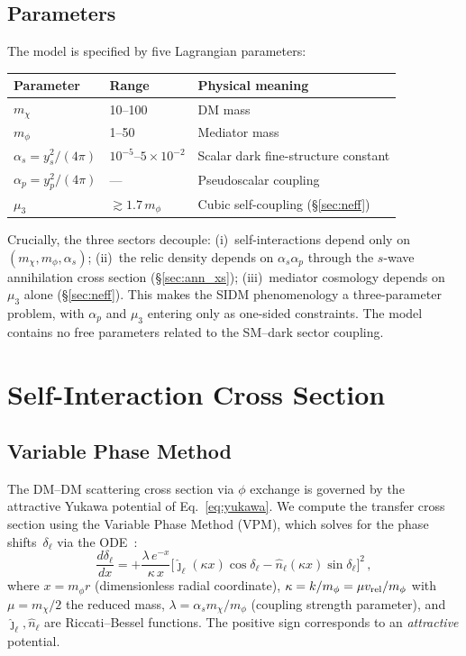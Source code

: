 \documentclass[aps,prd,twocolumn,superscriptaddress,nofootinbib]{revtex4-2}
\newcommand{\GeV}{\,\text{GeV}}
\newcommand{\MeV}{\,\text{MeV}}
\newcommand{\mchi}{m_\chi}
\newcommand{\mphi}{m_\phi}
\newcommand{\vrel}{v_{\rm rel}}
\newcommand{\lam}{\lambda}
\begin{document}
\subsection{Parameters}\label{sec:params}

The model is specified by five Lagrangian parameters:

\begin{table}[h]
\centering
\begin{tabular}{lll}
\toprule
Parameter & Range & Physical meaning \\
\midrule
$\mchi$ & 10--100\GeV & DM mass \\
$\mphi$ & 1--50\MeV & Mediator mass \\
$\alpha_s = y_s^{2}/(4\pi)$ & $10^{-5}$--$5\times10^{-2}$ & Scalar dark fine-structure constant \\
$\alpha_p = y_p^{2}/(4\pi)$ & --- & Pseudoscalar coupling \\
$\mu_{3}$ & $\gtrsim 1.7\,\mphi$ & Cubic self-coupling (\S\ref{sec:neff}) \\
\bottomrule
\end{tabular}
\end{table}

Crucially, the three sectors decouple:
(i)~self-interactions depend only on $(\mchi,\mphi,\alpha_s)$;
(ii)~the relic density depends on $\alpha_s\alpha_p$ through the
$s$-wave annihilation cross section (\S\ref{sec:ann_xs});
(iii)~mediator cosmology depends on $\mu_3$ alone
(\S\ref{sec:neff}).  This makes the SIDM phenomenology a
three-parameter problem, with $\alpha_p$ and $\mu_3$ entering only as
one-sided constraints.  The model contains no free parameters related
to the SM--dark sector coupling.

\section{Self-Interaction Cross Section}\label{sec:sigma}

\subsection{Variable Phase Method}\label{sec:vpm}

The DM--DM scattering cross section via $\phi$ exchange is governed by
the attractive Yukawa potential of Eq.~\eqref{eq:yukawa}.  We compute
the transfer cross section using the Variable Phase Method (VPM), which
solves for the phase shifts~$\delta_\ell$ via the ODE~\cite{Hulthen:1942}:
\begin{equation}\label{eq:vpm_ode}
  \frac{d\delta_\ell}{dx}
  = +\frac{\lam\,e^{-x}}{\kappa\,x}
    \bigl[\hat\jmath_\ell(\kappa x)\cos\delta_\ell
          -\hat n_\ell(\kappa x)\sin\delta_\ell\bigr]^{2}\,,
\end{equation}
where $x=\mphi r$ (dimensionless radial coordinate),
$\kappa=k/\mphi=\mu\vrel/\mphi$ with $\mu=\mchi/2$ the reduced mass,
$\lam=\alpha_s\mchi/\mphi$ (coupling strength parameter), and
$\hat\jmath_\ell,\hat n_\ell$ are Riccati--Bessel functions.  The
positive sign corresponds to an \emph{attractive} potential.
\end{document}
